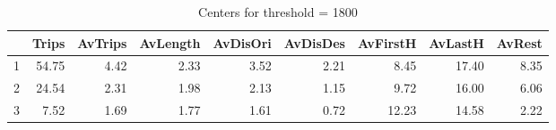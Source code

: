 \begin{table*}[ht]
\centering
\begin{tabular}{rrrrrrrrr}
  \hline
 & Trips & AvTrips & AvLength & AvDisOri & AvDisDes & AvFirstH & AvLastH & AvRest \\
  \hline
1 & 54.75 & 4.42 & 2.33 & 3.52 & 2.21 & 8.45 & 17.40 & 8.35 \\
  2 & 24.54 & 2.31 & 1.98 & 2.13 & 1.15 & 9.72 & 16.00 & 6.06 \\
  3 & 7.52 & 1.69 & 1.77 & 1.61 & 0.72 & 12.23 & 14.58 & 2.22 \\
   \hline
\end{tabular}
\caption{Centers for threshold = 1800}
\end{table*}

\clearpage
